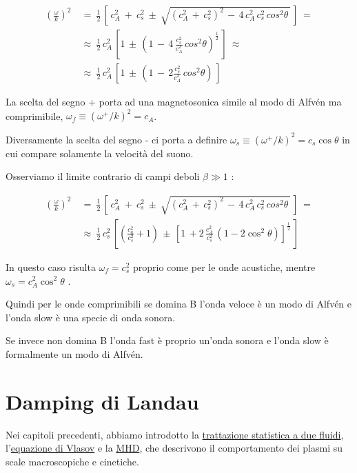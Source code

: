 \[\begin{aligned}
	\left( \frac{\omega}{k} \right)^2\ 
	&=\ \frac{1}{2}\, \left[\, c^2_A\ +\ c^2_s\ \pm\ \sqrt{(c_A^2\, +\, c_s^2)^2\, -\, 4\, c^2_A\, c^2_s\, cos^2\theta\,}\, \right]\ =\\
	&\approx\ \frac{1}{2}\, c_A^2\, \left[1\, \pm\, \left(1\,-\, 4\,\frac{c_s^2}{c_A^2}\, cos^2\theta\right)^\frac{1}{2}\,\right]\ \approx\\
	&\approx\  \frac{1}{2}\, c_A^2\,\left[ 1\,\pm\, \left(1\,-\, 2\frac{c_s^2}{c_A^2}\, cos^2\theta\right)\,\right] 
\end{aligned}\]

La scelta del segno + porta ad una magnetosonica simile al modo di Alfvén ma comprimibile, $\boxed{\omega_f\equiv (\omega^+/k)^2=c_A}$.
 
Diversamente la scelta del segno - ci porta a definire $\boxed{\omega_s\equiv (\omega^+/k)^2=c_s \cos\theta}$ in cui compare solamente la velocità del suono.

\vspace{0.5cm}
Osserviamo il limite contrario di campi deboli $\boxed{\beta \gg 1}$ :

\[\begin{aligned}
	\left( \frac{\omega}{k} \right)^2\ 
	&=\ \frac{1}{2}\, \left[\, c^2_A\ +\ c^2_s\ \pm\ \sqrt{(c_A^2\, +\, c_s^2)^2\, -\, 4\, c^2_A\, c^2_s\, cos^2\theta\,}\, \right]\ =\\
	&\approx\ \frac{1}{2}\, c_s^2\, \left[\left(\frac{c_a^2}{c_s^2} + 1\right)\, \pm\, \left[1\,+ 2\,\frac{c_A^2}{c_s^2}\,(1- 2\cos^2\theta)\right]^\frac{1}{2}\,\right]
\end{aligned} \]

In questo caso risulta $\boxed{\omega_f=c_s^2}$ proprio come per le onde acustiche, mentre $\boxed{\omega_s=c_A^2 \cos^2\theta}$ .

Quindi per le onde comprimibili se domina B l'onda veloce è un modo di Alfvén e l'onda slow è una specie di onda sonora.

Se invece non domina B l'onda fast è proprio un'onda sonora e l'onda slow è formalmente un modo di Alfvén.


%
%
%
%
%
\vspace{0.5cm}
\section{Damping di Landau}

Nei capitoli precedenti, abbiamo introdotto la \underline{trattazione statistica a due fluidi}, l'\underline{equazione di Vlasov} e la \underline{MHD}, che descrivono il comportamento dei plasmi su scale macroscopiche e cinetiche. 

